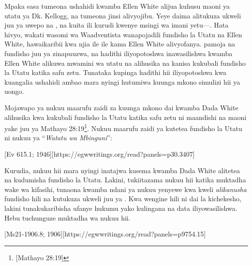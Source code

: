 
Mpaka sasa tumeona ushahidi kwamba Ellen White alijua kuhusu maoni ya utatu ya Dk. Kellogg, na tumeona jinsi alivyojibu. Yeye daima alitukuza ukweli juu ya uwepo na , na kuita ili kurudi kwenye msingi wa imani yetu—. Hata hivyo, wakati wasomi wa Waadventista wanapojadili fundisho la Utatu na Ellen White, hawaikaribii kwa njia ile ile kama Ellen White alivyofanya.  pamoja na fundisho juu ya  zinapuuzwa, na hadithi iliyopotoshwa inawasilishwa kwamba Ellen White alikuwa mwamini wa utatu na alihusika na kanisa kukubali fundisho la Utatu katika safu zetu. Tunataka kupinga hadithi hii iliyopotoshwa kwa kuangalia ushahidi ambao mara nyingi hutumiwa kuunga mkono simulizi hii ya uongo.

Mojawapo ya nukuu maarufu zaidi za kuunga mkono dai kwamba Dada White alihusika kwa kukubali fundisho la Utatu katika safu zetu ni maandishi na maoni yake juu ya Mathayo 28:19\footnote{[Mathayo 28:19]}. Nukuu maarufu zaidi ya kutetea fundisho la Utatu ni nukuu ya “\textit{Watatu wa Mbinguni}”:

[Ev 615.1; 1946][https://egwwritings.org/read?panels=p30.3407]

Kurudia, nukuu hii mara nyingi inatajwa kusema kwamba Dada White alitetea na kudumisha fundisho la Utatu. Lakini, tukiitazama nukuu hii katika muktadha wake wa kifasihi, tunaona kwamba ndani ya nukuu yenyewe kwa kweli \textit{alikanusha} fundisho hili na kutukuza ukweli juu ya . Kwa wengine hili ni dai la kichekesho, lakini tunakukaribisha ufanye hukumu yako kulingana na data iliyowasilishwa. Hebu tuchunguze muktadha wa nukuu hii.

[Ms21-1906.8; 1906][https://egwwritings.org/read?panels=p9754.15]

